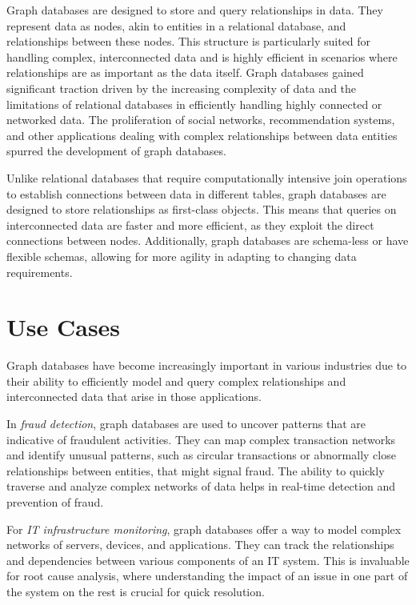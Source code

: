 Graph databases are designed to store and query relationships in data. They represent data as nodes, akin to entities in a relational database, and relationships between these nodes. This structure is particularly suited for handling complex, interconnected data and is highly efficient in scenarios where relationships are as important as the data itself. Graph databases gained significant traction driven by the increasing complexity of data and the limitations of relational databases in efficiently handling highly connected or networked data. The proliferation of social networks, recommendation systems, and other applications dealing with complex relationships between data entities spurred the development of graph databases.

Unlike relational databases that require computationally intensive join operations to establish connections between data in different tables, graph databases are designed to store relationships as first-class objects. This means that queries on interconnected data are faster and more efficient, as they exploit the direct connections between nodes. Additionally, graph databases are schema-less or have flexible schemas, allowing for more agility in adapting to changing data requirements.

\section{Use Cases}

Graph databases have become increasingly important in various industries due to their ability to efficiently model and query complex relationships and interconnected data that arise in those applications. 

In \emph{fraud detection}, graph databases are used to uncover patterns that are indicative of fraudulent activities. They can map complex transaction networks and identify unusual patterns, such as circular transactions or abnormally close relationships between entities, that might signal fraud. The ability to quickly traverse and analyze complex networks of data helps in real-time detection and prevention of fraud.

For \emph{IT infrastructure monitoring}, graph databases offer a way to model complex networks of servers, devices, and applications. They can track the relationships and dependencies between various components of an IT system. This is invaluable for root cause analysis, where understanding the impact of an issue in one part of the system on the rest is crucial for quick resolution.

